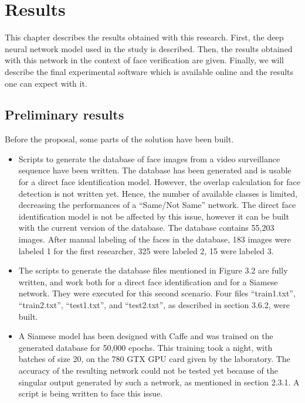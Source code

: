 \setlength{\footskip}{8mm}

\chapter{Results}

\label{ch:results}

This chapter describes the results obtained with this research.
First, the deep neural network model used in the study is described. Then, the results obtained with this network in the context of face verification are given. Finally, we will describe the final experimental software which is available online and the results one can expect with it.

\section{Preliminary results}
Before the proposal, some parts of the solution have been built.
\begin{itemize}
\item Scripts to generate the database of face images from a video surveillance sequence have been written. The database has been generated and is usable for a direct face identification model. However, the overlap calculation for face detection is not written yet. Hence, the number of available classes is limited, decreasing the performances of a \enquote{Same/Not Same} network. The direct face identification model is not be affected by this issue, however it can be built with the current version of the database. The database contains 55,203 images. After manual labeling of the faces in the database, 183 images were labeled 1 for the first researcher, 325 were labeled 2, 15 were labeled 3.
\item The scripts to generate the database files mentioned in Figure 3.2 are fully written, and work both for a direct face identification and for a Siamese network. They were executed for this second scenario. Four files \enquote{train1.txt}, \enquote{train2.txt}, \enquote{test1.txt}, and \enquote{test2.txt}, as described in section 3.6.2, were built.
\item A Siamese model has been designed with Caffe and was trained on the generated database for 50,000 epochs. This training took a night, with batches of size 20, on the 780 GTX GPU card given by the laboratory. The accuracy of the resulting network could not be tested yet because of the singular output generated by such a network, as mentioned in section 2.3.1. A script is being written to face this issue.
\end{itemize}

